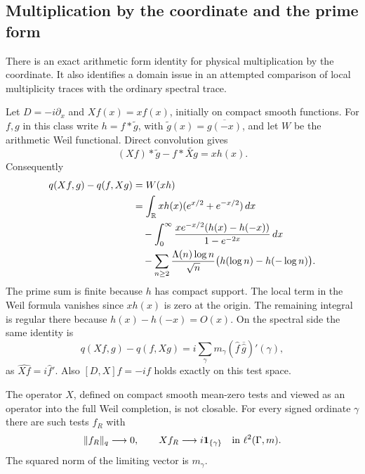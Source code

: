 \subsection{Multiplication by the coordinate and the prime form}
\label{subsec:fd-prime-commutator}

There is an exact arithmetic form identity for physical
multiplication by the coordinate. It also identifies a domain issue
in an attempted comparison of local multiplicity traces with the
ordinary spectral trace.

Let \(D=-i\partial_x\) and \(Xf(x)=xf(x)\), initially on compact
smooth functions. For \(f,g\) in this class write
\(h=f*\widetilde g\), with
\(\widetilde g(x)=\overline{g(-x)}\), and let \(W\) be the
arithmetic Weil functional. Direct convolution gives
\[
 (Xf)*\widetilde g-f*\widetilde{Xg}=xh(x).
\]
Consequently
\begin{align}
 q(Xf,g)-q(f,Xg)
 &=W(xh)\notag\\
 &=\int_{\mathbb R}xh(x)(e^{x/2}+e^{-x/2})\,dx\notag\\
 &\quad-\int_0^\infty
 \frac{xe^{-x/2}(h(x)-h(-x))}{1-e^{-2x}}\,dx\notag\\
 &\quad-\sum_{n\ge2}\frac{\Lambda(n)\log n}{\sqrt n}
                  \bigl(h(\log n)-h(-\log n)\bigr).
 \label{eq:fd-prime-commutator}
\end{align}
The prime sum is finite because \(h\) has compact support.
The local term in the Weil formula vanishes since \(xh(x)\) is zero
at the origin. The remaining integral is regular there because
\(h(x)-h(-x)=O(x)\). On the spectral side the same identity is
\[
 q(Xf,g)-q(f,Xg)
 =i\sum_\gamma m_\gamma
        (\widehat f\,\overline{\widehat g})'(\gamma),
\]
as \(\widehat{Xf}=i\widehat f'\). Also
\([D,X]f=-if\) holds exactly on this test space.

\begin{proposition}
\label{prop:fd-multiplication-domain}
The operator \(X\), defined on compact smooth mean-zero tests and
viewed as an operator into the full Weil completion, is not closable.
For every signed ordinate \(\gamma\) there are such tests \(f_R\)
with
\[
 \|f_R\|_q\longrightarrow0,
 \qquad
 Xf_R\longrightarrow i\mathbf1_{\{\gamma\}}
       \quad\hbox{in }\ell^2(\Gamma,m).
\]
The squared norm of the limiting vector is \(m_\gamma\).
\end{proposition}

